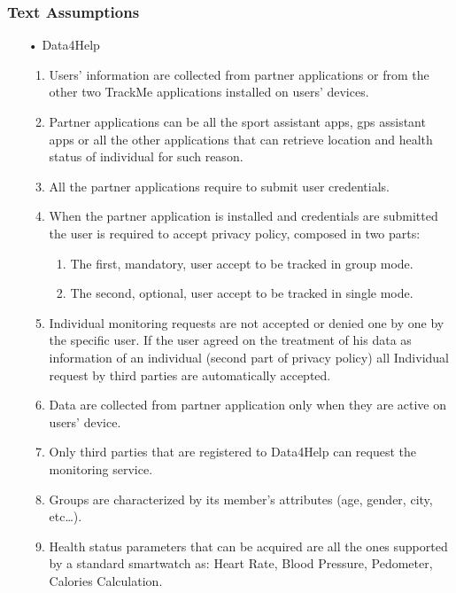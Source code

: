 \subsubsection{Text Assumptions}
\begin{enumerate}

\item[•] {\Large Data4Help}
	\begin{enumerate}
	\item Users' information are collected from partner applications or from the other two TrackMe applications installed on users' devices.
	\item Partner applications can be all the sport assistant apps, gps assistant apps or all the other applications that can retrieve location and health status of individual for such reason.
	\item All the partner applications require to submit user credentials. 
	\item When the partner application is installed and credentials are submitted
	the user is required to accept privacy policy, composed in two parts:
		\begin{enumerate}
		\item The first, mandatory, user accept to be tracked in group mode.
		\item The second, optional, user accept to be tracked in single mode.
		\end{enumerate}
	\item Individual monitoring requests are not accepted or denied one by one by the specific user. If the user agreed on the treatment of his data as information of an individual (second part of privacy policy) all Individual request by third parties are automatically accepted.	
	\item Data are collected from partner application only when they are active on users' device.
	\item Only third parties that are registered to Data4Help can request the monitoring service.
	\item Groups are characterized by its member’s attributes (age, gender, city, etc…).
	\item Health status parameters that can be acquired are all the ones supported by a standard smartwatch as: Heart Rate, Blood Pressure, Pedometer, Calories Calculation.
	\end{enumerate}
	

\end{enumerate}
